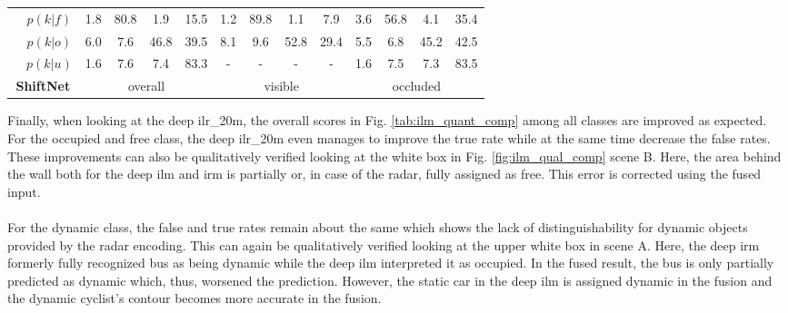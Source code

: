 \begin{center}
\begin{tabular}{c|c|cccc|cccc|cccc}
		&$p(k|f)$ & \textcolor{myred}{1.8} & \textcolor{mygreen}{80.8} & \textcolor{myred}{1.9} & 15.5 & \textcolor{myred}{1.2} & \textcolor{mygreen}{89.8} & \textcolor{myred}{1.1} & 7.9 & \textcolor{myred}{3.6} & \textcolor{mygreen}{56.8} & \textcolor{myred}{4.1} & 35.4\\
		&$p(k|o)$ & \textcolor{myred}{6.0} & \textcolor{myred}{7.6} & \textcolor{mygreen}{46.8} & 39.5 & \textcolor{myred}{8.1} & \textcolor{myred}{9.6} & \textcolor{mygreen}{52.8} & 29.4 & \textcolor{myred}{5.5} & \textcolor{myred}{6.8} & \textcolor{mygreen}{45.2} & 42.5\\
		&$p(k|u)$ & 1.6 & 7.6 & 7.4 & 83.3 & - & - & - & - & 1.6 & 7.5 & 7.3 & 83.5\\
		\hline
		\multicolumn{2}{c|}{\textbf{ShiftNet}} & \multicolumn{4}{c|}{overall} & \multicolumn{4}{c|}{visible} & \multicolumn{4}{c}{occluded}
	\end{tabular}
\end{center}
Finally, when looking at the deep \gls{ilr_20m}, the overall scores in Fig. \ref{tab:ilm_quant_comp} among all classes are improved as expected. For the occupied and free class, the deep \gls{ilr_20m} even manages to improve the true rate while at the same time decrease the false rates. These improvements can also be qualitatively verified looking at the white box in Fig. \ref{fig:ilm_qual_comp} scene B. Here, the area behind the wall both for the deep \gls{ilm} and \gls{irm} is partially or, in case of the radar, fully assigned as free. This error is corrected using the fused input.
\\\\
For the dynamic class, the false and true rates remain about the same which shows the lack of distinguishability for dynamic objects provided by the radar encoding. This can again be qualitatively verified looking at the upper white box in scene A. Here, the deep \gls{irm} formerly fully recognized bus as being dynamic while the deep \gls{ilm} interpreted it as occupied. In the fused result, the bus is only partially predicted as dynamic which, thus, worsened the prediction. However, the static car in the deep \gls{ilm} is assigned dynamic in the fusion and the dynamic cyclist's contour becomes more accurate in the fusion.
\begin{center}
\end{center}
%

